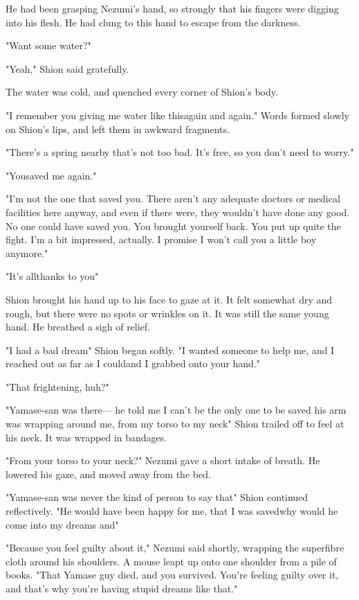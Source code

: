 He had been grasping Nezumi's hand, so strongly that his fingers were
digging into his flesh. He had clung to this hand to escape from the
darkness.

"Want some water?"

"Yeah," Shion said gratefully.

The water was cold, and quenched every corner of Shion's body.

"I remember you giving me water like this\el again and again." Words
formed slowly on Shion's lips, and left them in awkward fragments.

"There's a spring nearby that's not too bad. It's free, so you don't
need to worry."

"You\el saved me again."

"I'm not the one that saved you. There aren't any adequate doctors or
medical facilities here anyway, and even if there were, they wouldn't
have done any good. No one could have saved you. You brought yourself
back. You put up quite the fight. I'm a bit impressed, actually. I
promise I won't call you a little boy anymore."

"It's all\el thanks to you\el "

Shion brought his hand up to his face to gaze at it. It felt somewhat
dry and rough, but there were no spots or wrinkles on it. It was still
the same young hand. He breathed a sigh of relief.

"I had a bad dream\el " Shion began softly. "I wanted someone to help
me, and I reached out as far as I could\el and I grabbed onto your
hand."

"That frightening, huh?"

"Yamase-san was there--- he told me I can't be the only one to be saved\el 
his arm was wrapping around me, from my torso to my neck\el " Shion
trailed off to feel at his neck. It was wrapped in bandages.

"From your torso to your neck?" Nezumi gave a short intake of breath. He
lowered his gaze, and moved away from the bed.

"Yamase-san was never the kind of person to say that\el " Shion continued
reflectively. "He would have been happy for me, that I was saved\el why
would he come into my dreams and\el "

"Because you feel guilty about it," Nezumi said shortly, wrapping the
superfibre cloth around his shoulders. A mouse leapt up onto one
shoulder from a pile of books. "That Yamase guy died, and you survived.
You're feeling guilty over it, and that's why you're having stupid
dreams like that."

